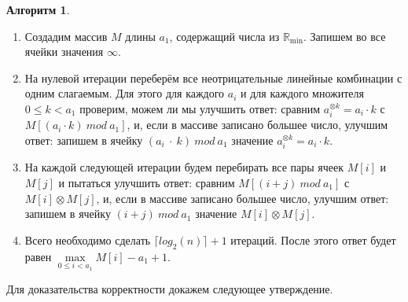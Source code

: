 \documentclass[12pt]{article}
\theoremstyle{definition}
\newtheorem{algorithm}[theorem]{Алгоритм}
\begin{document}
\begin{algorithm} { \ }
\label{algorithm}
\begin{enumerate}
	\item Создадим массив $M$ длины $a_1$, содержащий числа из $\mathbb{R}_{\min}$. Запишем во все ячейки значения $\infty$.
	
	\item На нулевой итерации переберём все неотрицательные линейные комбинации с одним слагаемым. Для этого для каждого $a_i$ и для каждого множителя $0 \le k < a_1$ проверим, можем ли мы улучшить ответ: сравним $a_i^{\otimes k} = a_i \cdot k$ с $M[(a_i \cdot k) \ mod \ a_1]$, и, если в массиве записано большее число, улучшим ответ: запишем в ячейку $(a_i~\cdot~k) \ mod \ a_1$ значение $a_i^{\otimes k} = a_i \cdot k$.
	
	\item На каждой следующей итерации будем перебирать все пары ячеек $M[i]$ и $M[j]$ и пытаться улучшить ответ: сравним $M[(i + j) \ mod \ a_1]$ с $M[i] \otimes M[j]$, и, если в массиве записано большее число, улучшим ответ: запишем в ячейку $(i + j) \ mod \ a_1$ значение $M[i] \otimes M[j]$.
	
	\item Всего необходимо сделать $\lceil log_2(n) \rceil + 1$ итераций. После этого ответ будет равен $\max\limits_{0 \le i < a_1} M[i] - a_1 + 1$.
\end{enumerate}
\end{algorithm}

Для доказательства корректности докажем следующее утверждение.
\end{document}
